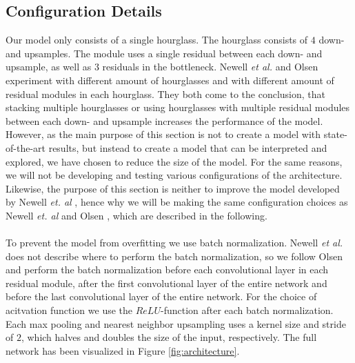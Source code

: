 \documentclass[./main.tex]{subfiles}
\begin{document}
\subsection{Configuration Details}\label{subsec:conf_details}
Our model only consists of a single hourglass. The hourglass consists of $4$ down- and upsamples. The module uses a single residual between each down- and upsample, as well as $3$ residuals in the bottleneck. Newell \textit{et al.} \cite{Newell} and Olsen \cite{Camilla} experiment with different amount of hourglasses and with different amount of residual modules in each hourglass. They both come to the conclusion, that stacking multiple hourglasses or using hourglasses with multiple residual modules between each down- and upsample increases the performance of the model. However, as the main purpose of this section is not to create a model with state-of-the-art results, but instead to create a model that can be interpreted and explored, we have chosen to reduce the size of the model. For the same reasons, we will not be developing and testing various configurations of the architecture. Likewise, the purpose of this section is neither to improve the model developed by Newell \textit{et. al} \cite{Newell}, hence why we will be making the same configuration choices as Newell \textit{et. al} \cite{Newell} and Olsen \cite{Camilla}, which are described in the following.
\\
\\
To prevent the model from overfitting we use batch normalization. Newell \textit{et al.} does not describe where to perform the batch normalization, so we follow Olsen \cite{Camilla} and perform the batch normalization before each convolutional layer in each residual module, after the first convolutional layer of the entire network and before the last convolutional layer of the entire network. For the choice of acitvation function we use the $ReLU$-function after each batch normalization. Each max pooling and nearest neighbor upsampling uses a kernel size and stride of $2$, which halves and doubles the size of the input, respectively. The full network has been visualized in Figure \ref{fig:architecture}.
\\
\end{document}
